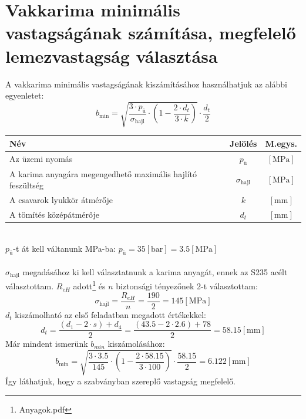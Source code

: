 \documentclass[10pt, a4paper]{article}
\newcommand{\baar}{\mathrm{\left[bar\right]}}
\newcommand{\mpa}{\mathrm{\left[MPa\right]}}
\newcommand{\mm}{\mathrm{\left[mm\right]}}
\begin{document}
	\section{Vakkarima minimális vastagságának számítása, megfelelő lemezvastagság választása}
	A vakkarima minimális vastagságának kiszámításához használhatjuk az alábbi egyenletet:
	\begin{equation}
		b_{\text{min}} = \sqrt{\dfrac{3 \cdot p_\text{ü}}{\sigma_{\text{hajl}}} \cdot \left(1 - \dfrac{2 \cdot d_t}{3 \cdot k}\right)} \cdot \dfrac{d_t}{2} \tag{2}
	\end{equation}
	\vspace{-15pt}
	\renewcommand{\arraystretch}{1.4}
		\begin{table}[!h]
			\centering
			\begin{tabular}{l|c|c}
				\textbf{Név}                              & \textbf{Jelölés} & \textbf{M.egys.} \\ \hline
				Az üzemi nyomás                     & $p_\text{ü}$                & $\mpa$          \\
				A karima anyagára megengedhető maximális hajlító feszültség           & $\sigma_{\text{hajl}}$                & $\mpa$			\\
				A csavarok lyukkör átmérője               & $k$                & $\mm$     \\
				A tömítés középátmérője                         & $d_t$                & $\mm$           
			\end{tabular}
		\end{table}
	\renewcommand{\arraystretch}{1}\\
	$p_\text{ü}$-t át kell váltanunk MPa-ba: $p_\text{ü} = 35 \baar = 3.5 \mpa$\\\\
	$\sigma_{\text{hajl}}$ megadásához ki kell választatnunk a karima anyagát, ennek az S235 acélt választottam. $R_{eH}$ adott\footnote{Anyagok.pdf} és $n$ biztonsági tényezőnek 2-t választottam:
	\begin{equation}
		\sigma_{\text{hajl}} = \dfrac{R_{eH}}{n} = \dfrac{190}{2} = 145 \mpa \tag{2.1}
	\end{equation}
	$d_t$ kiszámolható az első feladatban megadott értékekkel:
	\begin{equation}
		d_t = \dfrac{(d_1 - 2 \cdot s) + d_4}{2} = \dfrac{(43.5 - 2 \cdot 2.6) + 78}{2} = 58.15 \mm \tag{2.2} \label{dt}
	\end{equation}
	Már mindent ismerünk $b_{min}$ kiszámolásához:
	\begin{equation}
			b_{\text{min}} = \sqrt{\dfrac{3 \cdot 3.5}{145} \cdot \left(1 - \dfrac{2 \cdot 58.15}{3 \cdot 100}\right)} \cdot \dfrac{58.15}{2} = 6.122 \mm\tag{2}
	\end{equation}
	Így láthatjuk, hogy a szabványban szereplő vastagság megfelelő.
	\newpage
\end{document}
